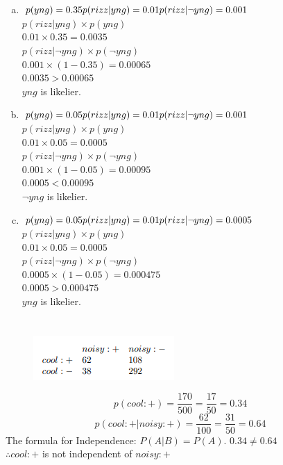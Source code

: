 \documentclass[12pt]{article}
\begin{document}
\section{}
\begin{enumerate}[a)]
    \item $p(yng)=0.35\\p(rizz|yng)=0.01\\p(rizz|\neg yng)=0.001$\\
    $p(rizz|yng)\times p(yng)$\\
    $0.01 \times 0.35 = 0.0035$\\
    $p(rizz|\neg yng) \times p(\neg yng)$\\
    $0.001 \times (1-0.35) = 0.00065$\\
    $0.0035>0.00065$\\
    $yng$ is likelier.

    \item $p(yng)=0.05\\p(rizz|yng)=0.01\\p(rizz|\neg yng)=0.001$\\
    $p(rizz|yng)\times p(yng)$\\
    $0.01 \times 0.05 = 0.0005$\\
    $p(rizz|\neg yng) \times p(\neg yng)$\\
    $0.001 \times (1-0.05) = 0.00095$\\
    $0.0005<0.00095$\\
    $\neg yng$ is likelier.

    \item $p(yng)=0.05\\p(rizz|yng)=0.01\\p(rizz|\neg yng)=0.0005$\\
    $p(rizz|yng)\times p(yng)$\\
    $0.01 \times 0.05 = 0.0005$\\
    $p(rizz|\neg yng) \times p(\neg yng)$\\
    $0.0005 \times (1-0.05) = 0.000475$\\
    $0.0005>0.000475$\\
    $yng$ is likelier.
\end{enumerate}


\newpage
\section{}
\begin{figure}[h]
    \centering
    \includegraphics[width=0.5\linewidth]{Q4 Table.png}
\end{figure}
\[
p(cool:+) = \frac{170}{500} = \frac{17}{50}=0.34
\]
\[
p(cool:+|noisy:+) = \frac{62}{100} = \frac{31}{50}=0.64
\]
The formula for Independence: $P(A|B)=P(A)$. $0.34\neq 0.64$\\
$\therefore cool:+$ is not independent of $noisy:+$
\end{document}
